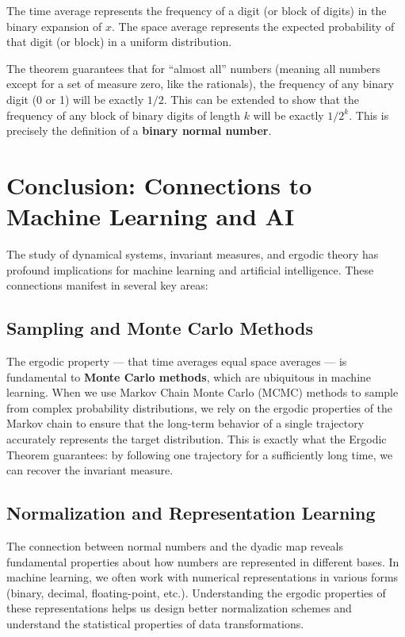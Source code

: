 \documentclass[12pt,a4paper]{article}
\begin{document}
The time average represents the frequency of a digit (or block of digits) in the binary expansion of $x$. The space average represents the expected probability of that digit (or block) in a uniform distribution.

The theorem guarantees that for ``almost all'' numbers (meaning all numbers except for a set of measure zero, like the rationals), the frequency of any binary digit (0 or 1) will be exactly $1/2$. This can be extended to show that the frequency of any block of binary digits of length $k$ will be exactly $1/2^k$. This is precisely the definition of a \textbf{binary normal number}.

\section{Conclusion: Connections to Machine Learning and AI}

The study of dynamical systems, invariant measures, and ergodic theory has profound implications for machine learning and artificial intelligence. These connections manifest in several key areas:

\subsection{Sampling and Monte Carlo Methods}

The ergodic property --- that time averages equal space averages --- is fundamental to \textbf{Monte Carlo methods}, which are ubiquitous in machine learning. When we use Markov Chain Monte Carlo (MCMC) methods to sample from complex probability distributions, we rely on the ergodic properties of the Markov chain to ensure that the long-term behavior of a single trajectory accurately represents the target distribution. This is exactly what the Ergodic Theorem guarantees: by following one trajectory for a sufficiently long time, we can recover the invariant measure.

\subsection{Normalization and Representation Learning}

The connection between normal numbers and the dyadic map reveals fundamental properties about how numbers are represented in different bases. In machine learning, we often work with numerical representations in various forms (binary, decimal, floating-point, etc.). Understanding the ergodic properties of these representations helps us design better normalization schemes and understand the statistical properties of data transformations.
\end{document}
